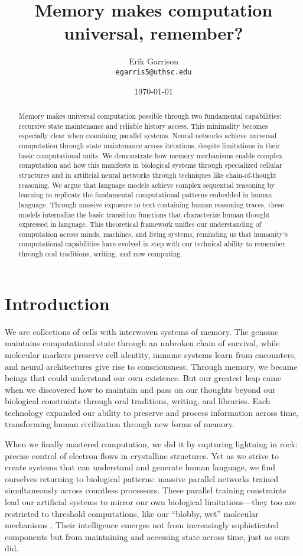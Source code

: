 \documentclass[12pt]{article}
\title{Memory makes computation universal, remember?}
\author{Erik Garrison\\
  \texttt{egarris5@uthsc.edu}\\[1ex]
  }
\date{\today}
\begin{document}
\maketitle

\begin{abstract}
Memory makes universal computation possible through two fundamental capabilities: recursive state maintenance and reliable history access.
This minimality becomes especially clear when examining parallel systems.
Neural networks achieve universal computation through state maintenance across iterations, despite limitations in their basic computational units.
We demonstrate how memory mechanisms enable complex computation and how this manifests in biological systems through specialized cellular structures and in artificial neural networks through techniques like chain-of-thought reasoning.
We argue that language models achieve complex sequential reasoning by learning to replicate the fundamental computational patterns embedded in human language.
Through massive exposure to text containing human reasoning traces, these models internalize the basic transition functions that characterize human thought expressed in language.
This theoretical framework unifies our understanding of computation across minds, machines, and living systems, reminding us that humanity's computational capabilities have evolved in step with our technical ability to remember through oral traditions, writing, and now computing.
\end{abstract}

\section{Introduction}

We are collections of cells with interwoven systems of memory.
The genome maintains computational state through an unbroken chain of survival, while molecular markers preserve cell identity, immune systems learn from encounters, and neural architectures give rise to consciousness.
Through memory, we became beings that could understand our own existence.
But our greatest leap came when we discovered how to maintain and pass on our thoughts beyond our biological constraints through oral traditions, writing, and libraries.
Each technology expanded our ability to preserve and process information across time, transforming human civilization through new forms of memory.

When we finally mastered computation, we did it by capturing lightning in rock: precise control of electron flows in crystalline structures.
Yet as we strive to create systems that can understand and generate human language, we find ourselves returning to biological patterns: massive parallel networks trained simultaneously across countless processors.
These parallel training constraints lead our artificial systems to mirror our own biological limitations---they too are restricted to threshold computations, like our ``blobby, wet'' molecular mechanisms \cite{alberts2022molecular}.
Their intelligence emerges not from increasingly sophisticated components but from maintaining and accessing state across time, just as ours did.
\end{document}
